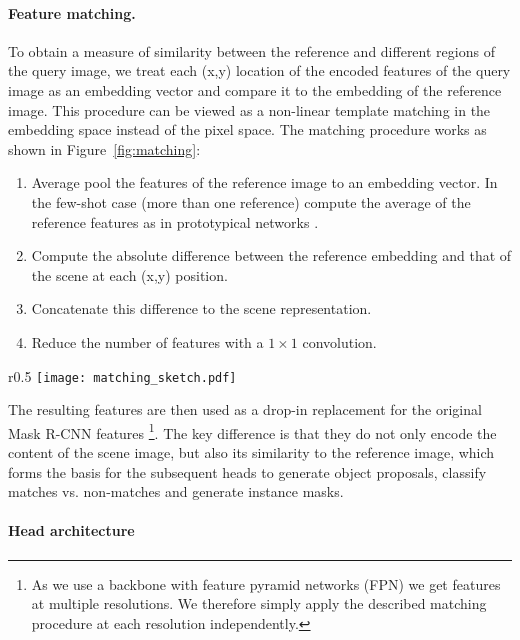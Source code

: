 \documentclass{article}
\begin{document}
\paragraph{Feature matching.}

To obtain a measure of similarity between the reference and different regions of the query image, we treat each (x,y) location of the encoded features of the query image as an embedding vector and compare it to the embedding of the reference image. This procedure can be viewed as a non-linear template matching in the embedding space instead of the pixel space. The matching procedure works as shown in Figure~\ref{fig:matching}:
\begin{enumerate}[nosep]
    \item Average pool the features of the reference image to an embedding vector. In the few-shot case (more than one reference) compute the average of the reference features as in prototypical networks \cite{Snell2017}.
    \item Compute the absolute difference between the reference embedding and that of the scene at each (x,y) position.
    \item Concatenate this difference to the scene representation.
    \item Reduce the number of features with a $1 \times 1$ convolution.
\end{enumerate}

\begin{wrapfigure}[7]{r}{0.5\textwidth}
    \vspace{-3.5mm}
    \texttt{[image: matching\_sketch.pdf]}
    \caption{Sketch of the matching procedure. }
    \label{fig:matching}
\end{wrapfigure}

The resulting features are then used as a drop-in replacement for the original Mask R-CNN features \footnote{As we use  a backbone with feature pyramid networks (FPN) we get features at multiple resolutions. We therefore simply apply the described matching procedure at each resolution independently.}. The key difference is that they do not only encode the content of the scene image, but also its similarity to the reference image, which forms the basis for the subsequent heads to generate object proposals, classify matches vs. non-matches and generate instance masks.


\paragraph{Head architecture}
\end{document}
